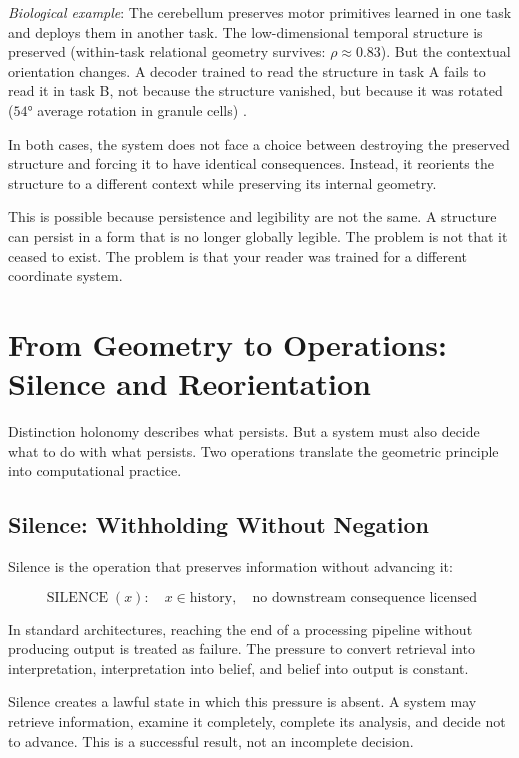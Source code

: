\documentclass[12pt]{article}
\begin{document}
\textit{Biological example}: The cerebellum preserves motor primitives learned in one task and deploys them in another task. The low-dimensional temporal structure is preserved (within-task relational geometry survives: $\rho \approx 0.83$). But the contextual orientation changes. A decoder trained to read the structure in task A fails to read it in task B, not because the structure vanished, but because it was rotated ($54°$ average rotation in granule cells) \cite{garcia2026}.

In both cases, the system does not face a choice between destroying the preserved structure and forcing it to have identical consequences. Instead, it reorients the structure to a different context while preserving its internal geometry.

This is possible because persistence and legibility are not the same. A structure can persist in a form that is no longer globally legible. The problem is not that it ceased to exist. The problem is that your reader was trained for a different coordinate system.

\section{From Geometry to Operations: Silence and Reorientation}

Distinction holonomy describes what persists. But a system must also decide what to do with what persists. Two operations translate the geometric principle into computational practice.

\subsection{Silence: Withholding Without Negation}

Silence is the operation that preserves information without advancing it:

\begin{equation}
\operatorname{SILENCE}(x): \quad x \in \text{history}, \quad \text{no downstream consequence licensed}
\end{equation}

In standard architectures, reaching the end of a processing pipeline without producing output is treated as failure. The pressure to convert retrieval into interpretation, interpretation into belief, and belief into output is constant.

Silence creates a lawful state in which this pressure is absent. A system may retrieve information, examine it completely, complete its analysis, and decide not to advance. This is a successful result, not an incomplete decision.
\end{document}
